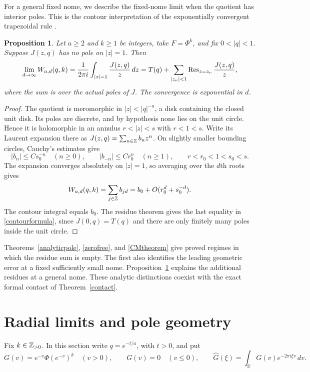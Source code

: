\documentclass[11pt]{amsart}
\newtheorem{proposition}[theorem]{Proposition}
\theoremstyle{definition}
\theoremstyle{remark}
\numberwithin{equation}{section}
\newcommand{\dd}{\,d}
\begin{document}
For a general fixed nome, we describe the fixed-nome limit when the quotient has interior poles. This is the contour interpretation of the exponentially convergent trapezoidal rule \cite{TrefethenWeideman}.

\begin{proposition}\label{contourlimit}
Let $a\ge2$ and $k\ge1$ be integers, take $F=\Phi^k$, and fix $0<|q|<1$. Suppose $J(z,q)$ has no pole on $|z|=1$. Then
\begin{equation}\label{contourformula}
 \lim_{d\to\infty}W_{a,d}(q,k)
 =\frac1{2\pi i}\int_{|z|=1}\frac{J(z,q)}z\dd z
 =T(q)+\sum_{|z_\nu|<1}\Res_{z=z_\nu}\frac{J(z,q)}z,
\end{equation}
where the sum is over the actual poles of $J$. The convergence is exponential in $d$.
\end{proposition}
\begin{proof}
The quotient is meromorphic in $|z|<|q|^{-a}$, a disk containing the closed unit disk. Its poles are discrete, and by hypothesis none lies on the unit circle. Hence it is holomorphic in an annulus $r<|z|<s$ with $r<1<s$. Write its Laurent expansion there as $J(z,q)=\sum_{n\in\mathbb Z}b_nz^n$. On slightly smaller bounding circles, Cauchy's estimates give
\[
 |b_n|\le C s_0^{-n}\quad(n\ge0),\qquad
 |b_{-n}|\le C r_0^n\quad(n\ge1),
 \qquad r<r_0<1<s_0<s.
\]
The expansion converges absolutely on $|z|=1$, so averaging over the $d$th roots gives
\[
 W_{a,d}(q,k)=\sum_{j\in\mathbb Z}b_{jd}
 =b_0+O(r_0^d+s_0^{-d}).
\]
The contour integral equals $b_0$. The residue theorem gives the last equality in \eqref{contourformula}, since $J(0,q)=T(q)$ and there are only finitely many poles inside the unit circle.
\end{proof}

Theorems~\ref{analyticpole}, \ref{zerofree}, and \ref{CMtheorem} give proved regimes in which the residue sum is empty. The first also identifies the leading geometric error at a fixed sufficiently small nome. Proposition~\ref{contourlimit} explains the additional residues at a general nome. These analytic distinctions coexist with the exact formal contact of Theorem~\ref{contact}.


\section{Radial limits and pole geometry}
Fix $k\in\mathbb Z_{>0}$. In this section write $q=e^{-t/a}$, with $t>0$, and put
\begin{equation}\label{Ganalytic}
 G(v)=e^{-v}\Phi(e^{-v})^k\quad(v>0),\qquad G(v)=0\quad(v\le0),
 \qquad \widehat G(\xi)=\int_{\mathbb R}G(v)e^{-2\pi i\xi v}\dd v.
\end{equation}
\end{document}
